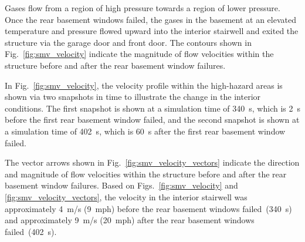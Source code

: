 \documentclass[12pt,oneside]{book}
\begin{document}
Gases flow from a region of high pressure towards a region of lower pressure. Once the rear basement windows failed, the gases in the basement at an elevated temperature and pressure flowed upward into the interior stairwell and exited the structure via the garage door and front door. The contours shown in Fig.~\ref{fig:smv_velocity} indicate the magnitude of flow velocities within the structure before and after the rear basement window failures.

In Fig.~\ref{fig:smv_velocity}, the velocity profile within the high-hazard areas is shown via two snapshots in time to illustrate the change in the interior conditions. The first snapshot is shown at a simulation time of 340~s, which is 2~s before the first rear basement window failed, and the second snapshot is shown at a simulation time of 402~s, which is 60~s after the first rear basement window failed.

The vector arrows shown in Fig.~\ref{fig:smv_velocity_vectors} indicate the direction and magnitude of flow velocities within the structure before and after the rear basement window failures. Based on Figs.~\ref{fig:smv_velocity} and \ref{fig:smv_velocity_vectors}, the velocity in the interior stairwell was approximately 4~m/s (9~mph) before the rear basement windows failed~(340~s) and approximately 9~m/s (20~mph) after the rear basement windows failed~(402~s).
\end{document}

